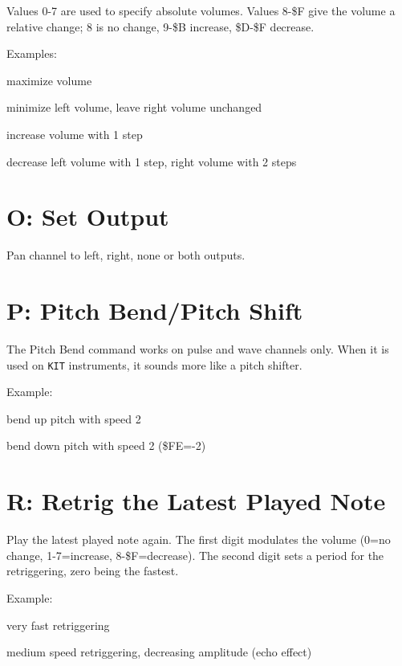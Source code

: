 Values 0-7 are used to specify absolute volumes. Values 8-\$F give the volume a relative change; 8 is no change, 9-\$B increase, \$D-\$F decrease.

\begin{description}
\item Examples:
\item[M77] maximize volume
\item[M08] minimize left volume, leave right volume unchanged
\item[M99] increase volume with 1 step
\item[MFE] decrease left volume with 1 step, right volume with 2 steps
\end{description}

\section{O: Set Output}

Pan channel to left, right, none or both outputs.

\section{P: Pitch Bend/Pitch Shift}

The Pitch Bend command works on pulse and wave channels only. When it is used on \texttt{KIT} instruments, it sounds more like a pitch shifter.

\begin{description}
\item Example:
\item[P02] bend up pitch with speed 2
\item[PFE] bend down pitch with speed 2 (\$FE=-2)
\end{description}

\section{R: Retrig the Latest Played Note}

Play the latest played note again. The first digit modulates the volume (0=no change, 1-7=increase, 8-\$F=decrease). The second digit sets a period for the retriggering, zero being the fastest.

\begin{description}
\item Example:
\item[R00] very fast retriggering
\item[RF3] medium speed retriggering, decreasing amplitude (echo effect)
\end{description}


